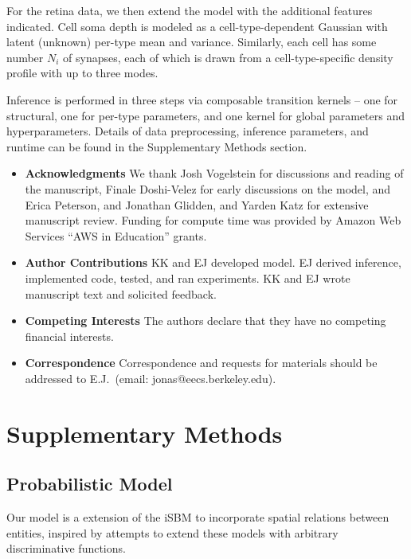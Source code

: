 \documentclass{article}
\begin{document}
For the retina data, we then extend the model with the additional
features indicated. Cell soma depth is modeled as a
cell-type-dependent Gaussian with latent (unknown) per-type mean and
variance. Similarly, each cell has some number $N_i$ of synapses, 
each of which is drawn from a cell-type-specific density profile
with up to three modes.


Inference is performed in three steps via composable transition 
kernels -- one for structural, one for per-type parameters, and
one kernel for global parameters and hyperparameters. Details
of data preprocessing, inference parameters, and runtime can
be found in the Supplementary Methods section. 

\printbibliography

\begin{itemize}

 \item \textbf{Acknowledgments} We thank Josh Vogelstein for discussions and reading of the manuscript, Finale Doshi-Velez for early discussions on the model, and Erica Peterson, and Jonathan Glidden, and Yarden Katz for extensive manuscript review. Funding for compute time was provided by Amazon Web Services ``AWS in Education'' grants. 
\item \textbf{Author Contributions} KK and EJ developed model. EJ derived inference, implemented code, tested, and ran experiments. KK and EJ wrote manuscript text and solicited feedback. 
 \item \textbf{Competing Interests} The authors declare that they have no
competing financial interests.
 \item \textbf{Correspondence} Correspondence and requests for materials
should be addressed to E.J.~(email: jonas@eecs.berkeley.edu).
\end{itemize}

\newpage
\section*{Supplementary Methods }

\subsection*{Probabilistic Model}

Our model is a extension of the iSBM
\autocite{Kemp2006a,Xu2006} to incorporate spatial relations between entities,
inspired by attempts to extend these models with arbitrary
discriminative functions\autocite{Murphy2012}.
\end{document}
